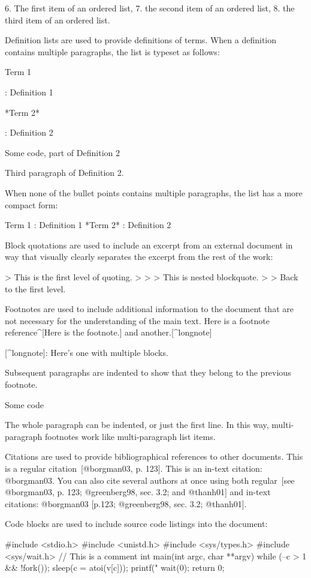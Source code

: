 \documentclass[
  digital,     %
  twoside,     %
  lof,         %
  lot,         %
]{fithesis4}
\begin{document}
\begin{markdown}
  6. The first item of an ordered list,
  7. the second item of an ordered list,
  8. the third item of an ordered list.

Definition lists are used to provide definitions of terms. When
a definition contains multiple paragraphs, the list is typeset
as follows:

Term 1

:   Definition 1

*Term 2*

:   Definition 2

        Some code, part of Definition 2

    Third paragraph of Definition 2.

When none of the bullet points contains multiple paragraphs, the
list has a more compact form:

Term 1
:   Definition 1
*Term 2*
:   Definition 2

Block quotations are used to include an excerpt from an external
document in way that visually clearly separates the excerpt from
the rest of the work:

> This is the first level of quoting.
>
> > This is nested blockquote.
>
> Back to the first level.

Footnotes are used to include additional information to the
document that are not necessary for the understanding of the main
text. Here is a footnote reference^[Here is the footnote.] and
another.[^longnote]

[^longnote]: Here's one with multiple blocks.

    Subsequent paragraphs are indented to show that they
belong to the previous footnote.

        Some code

    The whole paragraph can be indented, or just the first
    line.  In this way, multi-paragraph footnotes work like
    multi-paragraph list items.

Citations are used to provide bibliographical references to other
documents. This is a regular citation~[@borgman03, p. 123]. This is
an in-text citation: @borgman03. You can also cite several authors
at once using both regular~[see @borgman03, p. 123; @greenberg98,
sec.  3.2; and @thanh01] and in-text citations: @borgman03 [p.123;
@greenberg98, sec. 3.2; @thanh01].

Code blocks are used to include source code listings into the
document:

    #include <stdio.h>
    #include <unistd.h>
    #include <sys/types.h>
    #include <sys/wait.h>
    // This is a comment
    int main(int argc, char **argv)
    {
        while (--c > 1 && !fork());
        sleep(c = atoi(v[c]));
        printf("%
        wait(0);
        return 0;
    }


\end{markdown}
\end{document}
